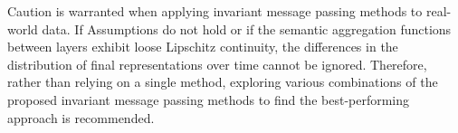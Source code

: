 Caution is warranted when applying invariant message passing methods to real-world data. If Assumptions do not hold or if the semantic aggregation functions between layers exhibit loose Lipschitz continuity, the differences in the distribution of final representations over time cannot be ignored. Therefore, rather than relying on a single method, exploring various combinations of the proposed invariant message passing methods to find the best-performing approach is recommended.
